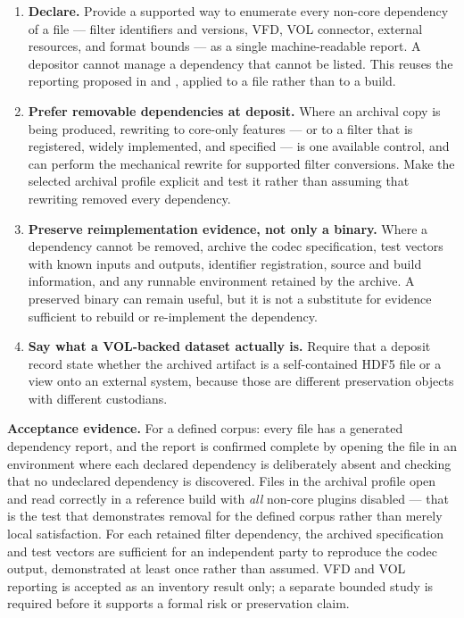 \documentclass[../main.tex]{subfiles}
\begin{document}
\begin{enumerate}
    \item \textbf{Declare.} Provide a supported way to enumerate every non-core
          dependency of a file --- filter identifiers and versions, VFD, VOL
          connector, external resources, and format bounds --- as a single
          machine-readable report. A depositor cannot manage a dependency that
          cannot be listed. This reuses the reporting proposed in
           and , applied to a file rather than to a
          build.
    \item \textbf{Prefer removable dependencies at deposit.} Where an archival
          copy is being produced, rewriting to core-only features --- or to a
          filter that is registered, widely implemented, and specified --- is
          one available control, and  can perform the mechanical
          rewrite for supported filter conversions. Make the selected archival
          profile explicit and test it rather than assuming that rewriting
          removed every dependency.
    \item \textbf{Preserve reimplementation evidence, not only a binary.} Where
          a dependency cannot be removed, archive the codec specification, test
          vectors with known inputs and outputs, identifier registration,
          source and build information, and any runnable environment retained
          by the archive. A preserved binary can remain useful, but it is not a
          substitute for evidence sufficient to rebuild or re-implement the
          dependency.
    \item \textbf{Say what a VOL-backed dataset actually is.} Require that a
          deposit record state whether the archived artifact is a
          self-contained HDF5 file or a view onto an external system, because
          those are different preservation objects with different custodians.
\end{enumerate}

\noindent\textbf{Acceptance evidence.}
For a defined corpus: every file has a generated dependency report, and the
report is confirmed complete by opening the file in an environment where each
declared dependency is deliberately absent and checking that no undeclared
dependency is discovered. Files in the archival profile open and read
correctly in a reference build with \emph{all} non-core plugins disabled ---
that is the test that demonstrates removal for the defined corpus rather than
merely local satisfaction. For each retained filter dependency, the archived
specification and test vectors are sufficient for an independent party to
reproduce the codec output, demonstrated at least once rather than assumed.
VFD and VOL reporting is accepted as an inventory result only; a separate
bounded study is required before it supports a formal risk or preservation
claim.
\fi
\end{document}
